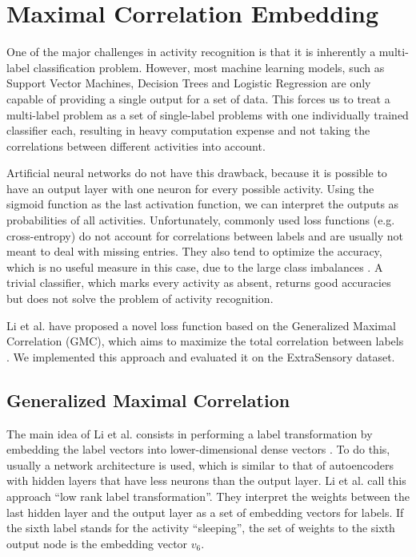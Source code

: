\section{Maximal Correlation Embedding}

One of the major challenges in activity recognition is that it is inherently a multi-label classification problem. However, most machine learning models, such as Support Vector Machines, Decision Trees and Logistic Regression are only capable of providing a single output for a set of data. This forces us to treat a multi-label problem as a set of single-label problems with one individually trained classifier each, resulting in heavy computation expense and not taking the correlations between different activities into account.

Artificial neural networks do not have this drawback, because it is possible to have an output layer with one neuron for every possible activity. Using the sigmoid function as the last activation function, we can interpret the outputs as probabilities of all activities. Unfortunately, commonly used loss functions (e.g. cross-entropy) do not account for correlations between labels and are usually not meant to deal with missing entries. They also tend to optimize the accuracy, which is no useful measure in this case, due to the large class imbalances \cite{Vaizman17}. A trivial classifier, which marks every activity as absent, returns good accuracies but does not solve the problem of activity recognition.

Li et al. have proposed a novel loss function based on the Generalized Maximal Correlation (GMC), which aims to maximize the total correlation between labels \cite{Li19}. We implemented this approach and evaluated it on the ExtraSensory dataset.

\subsection{Generalized Maximal Correlation}

The main idea of Li et al. consists in performing a label transformation by embedding the label vectors into lower-dimensional dense vectors \cite{li2019}. To do this, usually a network architecture is used, which is similar to that of autoencoders with hidden layers that have less neurons than the output layer. Li et al. call this approach \enquote{low rank label transformation}. They interpret the weights between the last hidden layer and the output layer as a set of embedding vectors for labels. If the sixth label stands for the activity \enquote{sleeping}, the set of weights to the sixth output node is the embedding vector $v_6$.


